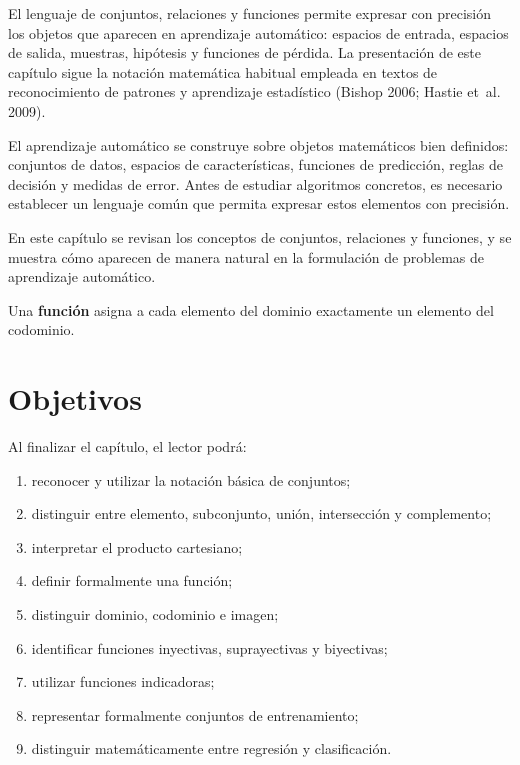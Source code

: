 \documentclass[
  spanish,
  10.5pt,
  letterpaper,
  DIV=11,
  numbers=noendperiod,
  oneside,
  open=any]{scrreprt}
\providecommand{\tightlist}{%
  \setlength{\itemsep}{0pt}\setlength{\parskip}{0pt}}
\theoremstyle{definition}
\theoremstyle{definition}
\theoremstyle{plain}
\theoremstyle{remark}
\begin{document}
El lenguaje de conjuntos, relaciones y funciones permite expresar con
precisión los objetos que aparecen en aprendizaje automático: espacios
de entrada, espacios de salida, muestras, hipótesis y funciones de
pérdida. La presentación de este capítulo sigue la notación matemática
habitual empleada en textos de reconocimiento de patrones y aprendizaje
estadístico (Bishop 2006; Hastie et~al. 2009).

El aprendizaje automático se construye sobre objetos matemáticos bien
definidos: conjuntos de datos, espacios de características, funciones de
predicción, reglas de decisión y medidas de error. Antes de estudiar
algoritmos concretos, es necesario establecer un lenguaje común que
permita expresar estos elementos con precisión.

En este capítulo se revisan los conceptos de conjuntos, relaciones y
funciones, y se muestra cómo aparecen de manera natural en la
formulación de problemas de aprendizaje automático.

\begin{tcolorbox}[enhanced jigsaw, arc=.35mm, bottomrule=.15mm, bottomtitle=1mm, breakable, colback=white, colbacktitle=quarto-callout-important-color!10!white, colframe=quarto-callout-important-color-frame, coltitle=black, left=2mm, leftrule=.75mm, opacityback=0, opacitybacktitle=0.6, rightrule=.15mm, title=\textcolor{quarto-callout-important-color}{\faExclamation}\hspace{0.5em}{Idea central}, titlerule=0mm, toprule=.15mm, toptitle=1mm]

Una \textbf{función} asigna a cada elemento del
dominio exactamente un elemento del codominio.

\end{tcolorbox}

\section*{Objetivos}\label{objetivos}


Al finalizar el capítulo, el lector podrá:

\begin{enumerate}
\def\labelenumi{\arabic{enumi}.}
\tightlist
\item
  reconocer y utilizar la notación básica de conjuntos;
\item
  distinguir entre elemento, subconjunto, unión, intersección y
  complemento;
\item
  interpretar el producto cartesiano;
\item
  definir formalmente una función;
\item
  distinguir dominio, codominio e imagen;
\item
  identificar funciones inyectivas, suprayectivas y biyectivas;
\item
  utilizar funciones indicadoras;
\item
  representar formalmente conjuntos de entrenamiento;
\item
  distinguir matemáticamente entre regresión y clasificación.
\end{enumerate}
\end{document}

